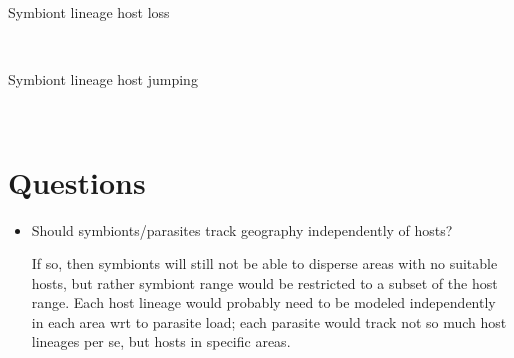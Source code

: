\documentclass[11pt]{article}
\begin{document}
\begin{description}
    \item[Symbiont lineage host loss]  \hfill \\
        \begin{minipage}[t]{\linewidth}
        \end{minipage}
    \item[Symbiont lineage host jumping]  \hfill \\
        \begin{minipage}[t]{\linewidth}
        \end{minipage}
\end{description}

\section{Questions}
\begin{itemize}
    \item
        Should symbionts/parasites track geography independently of hosts?

        If so, then symbionts will still not be able to disperse areas with no suitable hosts, but rather symbiont range would be restricted to a subset of the host range.
        Each host lineage would probably need to be modeled independently in each area wrt to parasite load; each parasite would track not so much host lineages per se, but hosts in specific areas.

\end{itemize}
\end{document}
